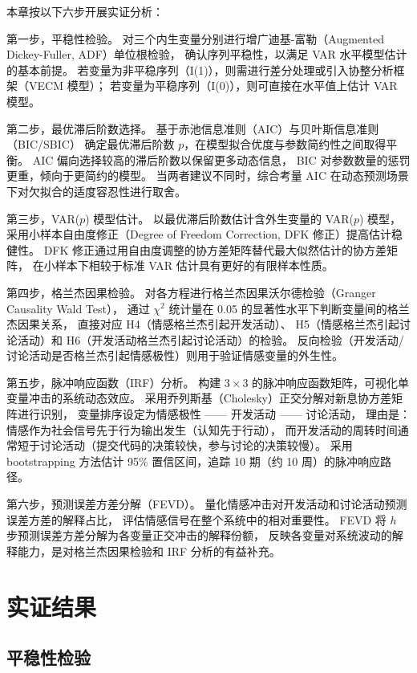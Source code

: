 \documentclass[
    type = master, %
    degree = professional,        %
    decl-page,  %
    twoside,                %
    fontset = fandol %
  ]{njuthesis}
\begin{document}
本章按以下六步开展实证分析：

第一步，平稳性检验。
对三个内生变量分别进行增广迪基-富勒（Augmented Dickey-Fuller, ADF）单位根检验，
确认序列平稳性，以满足 VAR 水平模型估计的基本前提。
若变量为非平稳序列（I(1)），则需进行差分处理或引入协整分析框架（VECM 模型）；
若变量为平稳序列（I(0)），则可直接在水平值上估计 VAR 模型。

第二步，最优滞后阶数选择。
基于赤池信息准则（AIC）与贝叶斯信息准则（BIC/SBIC）
确定最优滞后阶数 $p$，在模型拟合优度与参数简约性之间取得平衡。
AIC 偏向选择较高的滞后阶数以保留更多动态信息，
BIC 对参数数量的惩罚更重，倾向于更简约的模型。
当两者建议不同时，综合考量 AIC 在动态预测场景下对欠拟合的适度容忍性进行取舍。

第三步，VAR($p$) 模型估计。
以最优滞后阶数估计含外生变量的 VAR($p$) 模型，
采用小样本自由度修正（Degree of Freedom Correction, DFK 修正）提高估计稳健性。
DFK 修正通过用自由度调整的协方差矩阵替代最大似然估计的协方差矩阵，
在小样本下相较于标准 VAR 估计具有更好的有限样本性质。

第四步，格兰杰因果检验。
对各方程进行格兰杰因果沃尔德检验（Granger Causality Wald Test），
通过 $\chi^2$ 统计量在 0.05 的显著性水平下判断变量间的格兰杰因果关系，
直接对应 H4（情感格兰杰引起开发活动）、
H5（情感格兰杰引起讨论活动）和 H6（开发活动格兰杰引起讨论活动）的检验。
反向检验（开发活动/讨论活动是否格兰杰引起情感极性）则用于验证情感变量的外生性。

第五步，脉冲响应函数（IRF）分析。
构建 $3 \times 3$ 的脉冲响应函数矩阵，可视化单变量冲击的系统动态效应。
采用乔列斯基（Cholesky）正交分解对新息协方差矩阵进行识别，
变量排序设定为情感极性 —— 开发活动 —— 讨论活动，
理由是：情感作为社会信号先于行为输出发生（认知先于行动），
而开发活动的周转时间通常短于讨论活动（提交代码的决策较快，参与讨论的决策较慢）。
采用 bootstrapping 方法估计 95\% 置信区间，追踪 10 期（约 10 周）的脉冲响应路径。

第六步，预测误差方差分解（FEVD）。
量化情感冲击对开发活动和讨论活动预测误差方差的解释占比，
评估情感信号在整个系统中的相对重要性。
FEVD 将 $h$ 步预测误差方差分解为各变量正交冲击的解释份额，
反映各变量对系统波动的解释能力，是对格兰杰因果检验和 IRF 分析的有益补充。


\section{实证结果}

\subsection{平稳性检验}
\end{document}
